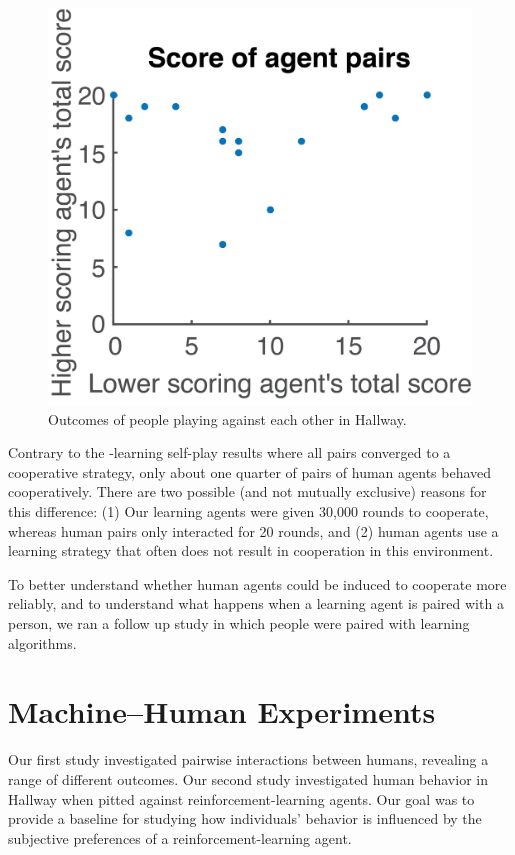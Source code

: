 \documentclass[letterpaper]{article}
\begin{document}
\begin{figure}
\centering
\includegraphics[width=0.8\columnwidth]{figures/agentPairScores4.png}
\caption{Outcomes of people playing against each other in Hallway.}
\label{f:human}
\end{figure}

Contrary to the \Q-learning self-play results where all pairs converged to
a cooperative strategy, only about one quarter of pairs of human
agents behaved cooperatively. There are two possible (and not mutually
exclusive) reasons for this difference: (1) Our learning agents were
given 30,000 rounds to cooperate, whereas human pairs only interacted
for 20 rounds, and (2) human agents use a learning strategy that often
does not result in cooperation in this environment.

To better understand whether human agents could be induced to
cooperate more reliably, and to understand what happens when a
learning agent is paired with a person, we ran a follow up study in
which people were paired with learning algorithms.


\section{Machine--Human Experiments}

Our first study investigated pairwise interactions between humans,
revealing a range of different outcomes. Our second study investigated
human behavior in Hallway when pitted against reinforcement-learning
agents. Our goal was to provide a baseline for studying how individuals'
behavior is influenced by the subjective preferences of a
reinforcement-learning agent.
\end{document}
